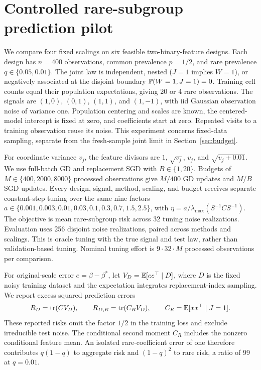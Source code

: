 \section{Controlled rare-subgroup prediction pilot}
\label{sec:pilot}

We compare four fixed scalings on six feasible two-binary-feature designs. Each
design has $n = 400$ observations, common prevalence $p = 1/2$, and rare
prevalence $q \in \{0.05,0.01\}$. The joint law is independent, nested ($J = 1$
implies $W = 1$), or negatively associated at the disjoint boundary
$\mathbb{P}(W = 1,J = 1) = 0$. Training cell counts equal their population
expectations, giving 20 or 4 rare observations. The signals are $(1,0)$,
$(0,1)$, $(1,1)$, and $(1,-1)$, with iid Gaussian observation noise of variance
one. Population centering and scales are known, the centered-model intercept is
fixed at zero, and coefficients start at zero. Repeated visits to a training
observation reuse its noise. This experiment concerns fixed-data sampling,
separate from the fresh-sample joint limit in Section~\ref{sec:budget}.

For coordinate variance $v_j$, the feature divisors are $1$, $\sqrt{v_j}$,
$v_j$, and $\sqrt{v_j + 0.01}$. We use full-batch GD and replacement SGD with
$B \in \{1,20\}$. Budgets of $M \in \{400,2000,8000\}$ processed observations
give $M/400$ GD updates and $M/B$ SGD updates. Every design, signal, method,
scaling, and budget receives separate constant-step tuning over the same nine
factors $a \in \{0.001,0.003,0.01,0.03,0.1,0.3,0.7,1.5,2.5\}$, with
$\eta = a/\lambda_{\max}(S^{-1}CS^{-1})$. The objective is mean rare-subgroup
risk across 32 tuning noise realizations. Evaluation uses 256 disjoint noise
realizations, paired across methods and scalings. This is oracle tuning with the
true signal and test law, rather than validation-based tuning. Nominal tuning
effort is $9 \cdot 32 \cdot M$ processed observations per comparison.

For original-scale error $e = \beta - \beta^*$, let $V_D = \mathbb{E}[ee^\top\mid D]$,
where $D$ is the fixed noisy training dataset and the expectation integrates
replacement-index sampling. We report excess squared prediction errors
\[
 R_D = \operatorname{tr}(CV_D),\qquad R_{D,R}
     = \operatorname{tr}(C_RV_D),\qquad C_R
     = \mathbb{E}[xx^\top\mid J=1].
\]
These reported risks omit the factor $1/2$ in the training loss and exclude
irreducible test noise. The conditional second moment $C_R$ includes the nonzero
conditional feature mean. An isolated rare-coefficient error of one therefore
contributes $q(1 - q)$ to aggregate risk and $(1 - q)^2$ to rare risk, a ratio
of 99 at $q = 0.01$.

